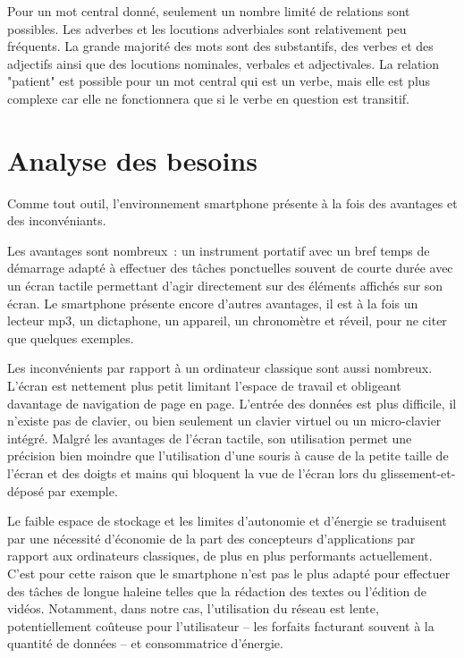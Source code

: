 \documentclass[a4paper,11pt,french]{article}
\begin{document}
Pour un mot central donné, seulement un nombre limité de relations sont possibles. Les adverbes et les locutions adverbiales sont relativement peu fréquents. La grande majorité des mots sont des substantifs, des verbes et des adjectifs ainsi que des locutions nominales, verbales et adjectivales. La relation "patient" est possible pour un mot central qui est un verbe, mais elle est plus complexe car elle ne fonctionnera que si le verbe en question est transitif. 

\pagebreak

\section{Analyse des besoins}

Comme tout outil, l'environnement smartphone présente à la fois des avantages et des inconvéniants. 

Les avantages sont nombreux~: un instrument portatif avec un bref temps de démarrage adapté à effectuer des tâches ponctuelles souvent de courte durée avec un écran tactile permettant d'agir directement sur des éléments affichés sur son écran. Le smartphone présente encore d'autres avantages, il est à la fois un lecteur mp3, un dictaphone, un appareil, un chronomètre et réveil, pour ne citer que quelques exemples.

Les inconvénients par rapport à un ordinateur classique sont aussi nombreux. L'écran est nettement plus petit limitant l'espace de travail
et obligeant davantage de navigation de page en page. L'entrée des données est plus difficile, il n'existe pas de clavier, ou bien seulement
un clavier virtuel ou un micro-clavier intégré. Malgré les avantages de l'écran tactile, son utilisation permet une précision bien moindre
que l'utilisation d'une souris à cause de la petite taille de l'écran et des doigts et mains qui bloquent la vue de l'écran lors du
glissement-et-déposé par exemple.

Le faible espace de stockage et les limites d'autonomie et d'énergie se traduisent par une nécessité d'économie de la part des concepteurs
d'applications par rapport aux ordinateurs classiques, de plus en plus performants actuellement. C'est pour cette raison que le smartphone
n'est pas le plus adapté pour effectuer des tâches de longue haleine telles que la rédaction des textes ou l'édition de vidéos. Notamment, dans notre cas,
l'utilisation du réseau est lente, potentiellement coûteuse pour l'utilisateur -- les forfaits facturant souvent à la quantité de données -- et
consommatrice d'énergie.
\end{document}

